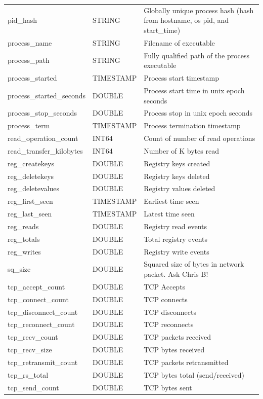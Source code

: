\documentclass[conference,compsoc]{IEEEtran}
\begin{document}
\begin{longtable}{|p{5cm}|p{2cm}|p{9cm}|}
pid\_hash & STRING & Globally unique process hash (hash from hostname, os pid, and start\_time) \\
process\_name & STRING & Filename of executable \\
process\_path & STRING & Fully qualified path of the process executable \\
process\_started & TIMESTAMP & Process start timestamp \\
process\_started\_seconds & DOUBLE & Process start time in unix epoch seconds \\
process\_stop\_seconds & DOUBLE & Process stop in unix epoch seconds \\
process\_term & TIMESTAMP & Process termination timestamp \\
read\_operation\_count & INT64 & Count of number of read operations \\
read\_transfer\_kilobytes & INT64 & Number of K bytes read \\
reg\_createkeys & DOUBLE & Registry keys created \\
reg\_deletekeys & DOUBLE & Registry keys deleted \\
reg\_deletevalues & DOUBLE & Registry values deleted \\
reg\_first\_seen & TIMESTAMP & Earliest time seen \\
reg\_last\_seen & TIMESTAMP & Latest time seen \\
reg\_reads & DOUBLE & Registry read events \\
reg\_totals & DOUBLE & Total registry events \\
reg\_writes & DOUBLE & Registry write events \\
sq\_size & DOUBLE & Squared size of bytes in network packet. Ask Chris B! \\
tcp\_accept\_count & DOUBLE & TCP Accepts \\
tcp\_connect\_count & DOUBLE & TCP connects \\
tcp\_disconnect\_count & DOUBLE & TCP disconnects \\
tcp\_reconnect\_count & DOUBLE & TCP reconnects \\
tcp\_recv\_count & DOUBLE & TCP packets received \\
tcp\_recv\_size & DOUBLE & TCP bytes received \\
tcp\_retransmit\_count & DOUBLE & TCP packets retransmitted \\
tcp\_rs\_total & DOUBLE & TCP bytes total (send/received) \\
tcp\_send\_count & DOUBLE & TCP bytes sent \\

\end{longtable}
\end{document}
